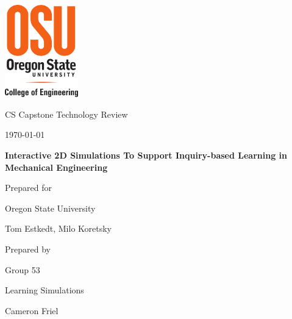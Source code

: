 \documentclass[capstone.tex]{subfiles}
\def \CapstoneTeamName{		Learning Simulations}
\def \CapstoneTeamNumber{		53}
\def \GroupMemberOne{			Cameron Friel}
\def \GroupMemberThree{			Samuel Wilson}
\def \CapstoneProjectName{		Interactive 2D Simulations To  Support Inquiry-based Learning in Mechanical Engineering}
\def \CapstoneSponsorCompany{	Oregon State University}
\def \CapstoneSponsorPerson{		Tom Estkedt, Milo Koretsky }
\def \DocType{		%
				Technology Review
				}
\newcommand{\NameSigPair}[1]{\par
\makebox[2.75in][r]{#1} \hfil 	\makebox[3.25in]{\makebox[2.25in]{\hrulefill} \hfill		\makebox[.75in]{\hrulefill}}
\par\vspace{-12pt} \textit{\tiny\noindent
\makebox[2.75in]{} \hfil		\makebox[3.25in]{\makebox[2.25in][r]{Signature} \hfill	\makebox[.75in][r]{Date}}}}
\renewcommand{\NameSigPair}[1]{#1}
\begin{document}
\begin{titlepage}
    \begin{singlespace}
    	\includegraphics[height=4cm]{coe_v_spot1}
        \hfill 
        \par\vspace{.2in}
        \centering
        \scshape{
            \huge CS Capstone \DocType \par
            {\large\today}\par
            \vspace{.5in}
            \textbf{\Huge\CapstoneProjectName}\par
            \vfill
            {\large Prepared for}\par
            \Huge \CapstoneSponsorCompany\par
            \vspace{5pt}
            {\Large\NameSigPair{\CapstoneSponsorPerson}\par}
            {\large Prepared by }\par
            Group\CapstoneTeamNumber\par
            \CapstoneTeamName\par 
            \vspace{5pt}
            {\Large
                \NameSigPair{\GroupMemberOne}\par
            }
            \vspace{20pt}
        }
        \begin{abstract}

\end{abstract}
\end{singlespace}
\end{titlepage}
\end{document}
